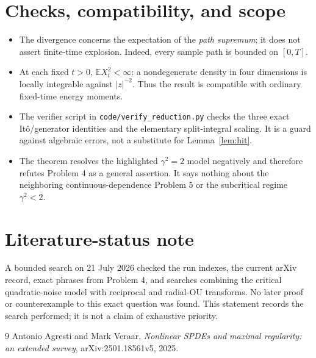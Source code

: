 \documentclass[10pt]{article}
\newcommand{\E}{\mathbb E}
\newcommand{\1}{\mathbf 1}
\begin{document}
\section{Checks, compatibility, and scope}

\begin{itemize}[leftmargin=*,itemsep=3pt]
\item The divergence concerns the expectation of the \emph{path supremum};
      it does not assert finite-time explosion.  Indeed, every sample path is
      bounded on $[0,T]$.
\item At each fixed $t>0$, $\E X_t^2<\infty$: a nondegenerate density in four
      dimensions is locally integrable against $|z|^{-2}$.  Thus the result is
      compatible with ordinary fixed-time energy moments.
\item The verifier script in \texttt{code/verify\_reduction.py} checks the
      three exact It\^o/generator identities and the elementary split-integral
      scaling.  It is a guard against algebraic errors, not a substitute for
      Lemma~\ref{lem:hit}.
\item The theorem resolves the highlighted $\gamma^2=2$ model negatively and
      therefore refutes Problem 4 as a general assertion.  It says nothing
      about the neighboring continuous-dependence Problem 5 or the subcritical
      regime $\gamma^2<2$.
\end{itemize}

\section*{Literature-status note}

A bounded search on 21 July 2026 checked the run indexes, the current arXiv
record, exact phrases from Problem 4, and searches combining the critical
quadratic-noise model with reciprocal and radial-OU transforms.  No later
proof or counterexample to this exact question was found.  This statement
records the search performed; it is not a claim of exhaustive priority.

\begin{thebibliography}{9}
Antonio Agresti and Mark Veraar,
\emph{Nonlinear SPDEs and maximal regularity: an extended survey},
arXiv:2501.18561v5, 2025.
\end{thebibliography}
\end{document}
